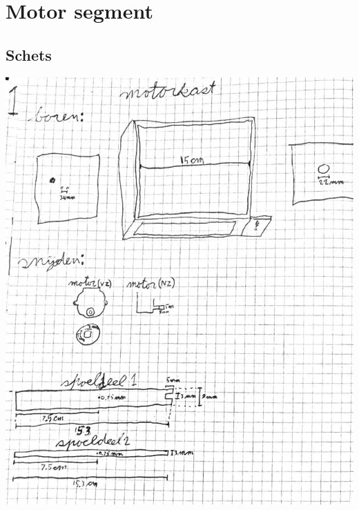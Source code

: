 \section{Motor segment}


\subsection{Schets}


\includegraphics[width=0.7\textheight, angle = 0]{src/schets/motor.pdf}

